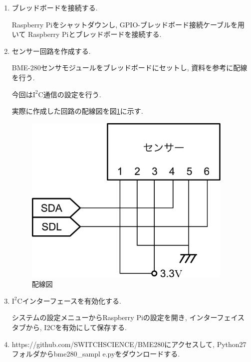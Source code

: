 \documentclass[titlepage]{jsarticle}
\begin{document}
            \begin{enumerate}
                \item ブレッドボードを接続する.

                    Raspberry Piをシャットダウンし, GPIO-ブレッドボード接続ケーブルを用いて
                    Raspberry Piとブレッドボードを接続する.

                \item センサー回路を作成する.

                    BME-280センサモジュールをブレッドボードにセットし, 
                    資料を参考に配線を行う.

                    今回は$\mathrm I^2 \mathrm C$通信の設定を行う.

                    実際に作成した回路の配線図を図\ref{fig: haisen}に示す.

                    \begin{figure}[ht]
                        \centering
                        \includegraphics[width=10cm]{images/haisen.pdf}
                        \caption{配線図}
                        \label{fig: haisen}
                    \end{figure}

                \item $\mathrm I^2 \mathrm C$インターフェースを有効化する.
                
                    システムの設定メニューからRaspberry Piの設定を開き,
                    インターフェイスタブから, I2Cを有効にして保存する.

                \item https://github.com/SWITCHSCIENCE/BME280にアクセスして,
                    Python27フォルダからbme280\_sampl e.pyをダウンロードする.


\end{enumerate}
\end{document}
